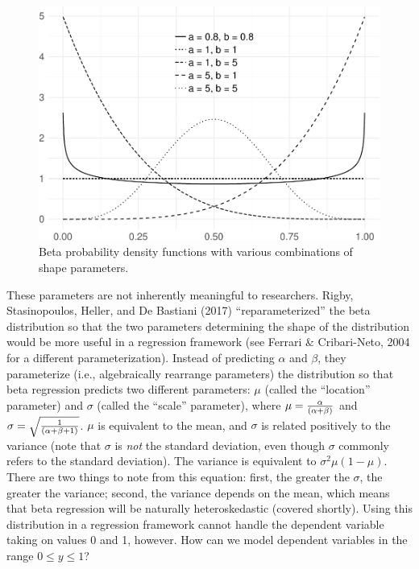 \documentclass[english,man]{apa6}
\theoremstyle{definition}
\theoremstyle{definition}
\theoremstyle{remark}
\begin{document}
\begin{figure}
\centering
\includegraphics{beta_hurdle_files/figure-latex/unnamed-chunk-2-1.pdf}
\caption{\label{fig:unnamed-chunk-2}Beta probability density functions with
various combinations of shape parameters.}
\end{figure}

These parameters are not inherently meaningful to researchers. Rigby,
Stasinopoulos, Heller, and De Bastiani (2017) \enquote{reparameterized}
the beta distribution so that the two parameters determining the shape
of the distribution would be more useful in a regression framework (see
Ferrari \& Cribari-Neto, 2004 for a different parameterization). Instead
of predicting \(\alpha\) and \(\beta\), they parameterize (i.e.,
algebraically rearrange parameters) the distribution so that beta
regression predicts two different parameters: \(\mu\) (called the
\enquote{location} parameter) and \(\sigma\) (called the \enquote{scale}
parameter), where \(\mu={\alpha\over(\alpha+\beta)}\) and
\(\sigma=\sqrt{1\over(\alpha+\beta+1)}\). \(\mu\) is equivalent to the
mean, and \(\sigma\) is related positively to the variance (note that
\(\sigma\) is \emph{not} the standard deviation, even though \(\sigma\)
commonly refers to the standard deviation). The variance is equivalent
to \(\sigma^2\mu(1-\mu)\). There are two things to note from this
equation: first, the greater the \(\sigma\), the greater the variance;
second, the variance depends on the mean, which means that beta
regression will be naturally heteroskedastic (covered shortly). Using
this distribution in a regression framework cannot handle the dependent
variable taking on values 0 and 1, however. How can we model dependent
variables in the range \(0 \leq y \leq 1\)?
\end{document}
